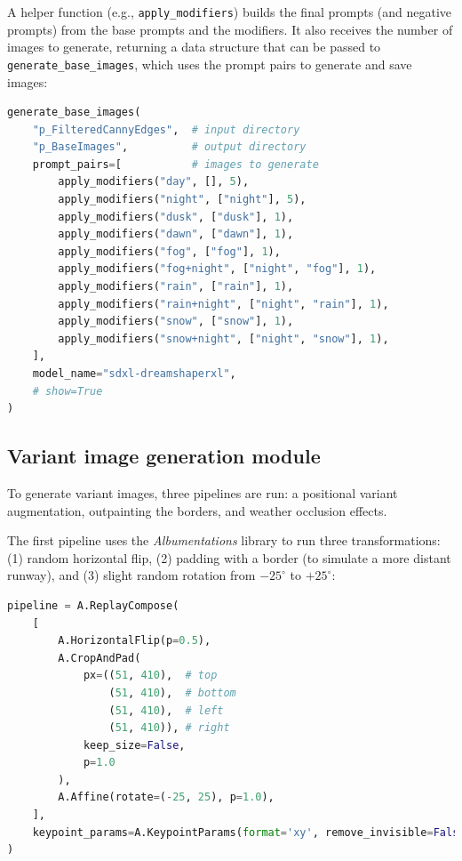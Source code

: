 A helper function (e.g., \texttt{apply\_modifiers}) builds the final prompts
(and negative prompts) from the base prompts and the modifiers. 
It also receives the number of images to generate, returning a data structure that can be passed to \texttt{generate\_base\_images}, which uses the prompt pairs to generate and save images:

\begin{lstlisting}[language=Python, caption={Base Image generation module,
generating base images}]
generate_base_images(
    "p_FilteredCannyEdges",  # input directory
    "p_BaseImages",          # output directory
    prompt_pairs=[           # images to generate
        apply_modifiers("day", [], 5),
        apply_modifiers("night", ["night"], 5),
        apply_modifiers("dusk", ["dusk"], 1),
        apply_modifiers("dawn", ["dawn"], 1),
        apply_modifiers("fog", ["fog"], 1),
        apply_modifiers("fog+night", ["night", "fog"], 1),
        apply_modifiers("rain", ["rain"], 1),
        apply_modifiers("rain+night", ["night", "rain"], 1),
        apply_modifiers("snow", ["snow"], 1),
        apply_modifiers("snow+night", ["night", "snow"], 1),
    ],
    model_name="sdxl-dreamshaperxl",
    # show=True
)
\end{lstlisting}

\subsection{Variant image generation module}

To generate variant images, three pipelines are run: a positional variant augmentation, outpainting the borders, and weather occlusion effects.

The first pipeline uses the \emph{Albumentations} library \cite{buslaev_albumentations_2020} to run three transformations: 
(1) random horizontal flip, 
(2) padding with a border (to simulate a more distant runway), and 
(3) slight random rotation from $-25^\circ$ to $+25^\circ$:

\begin{lstlisting}[language=Python, caption={Variant image generation module,
Albumentations pipeline}]
pipeline = A.ReplayCompose(
    [
        A.HorizontalFlip(p=0.5),
        A.CropAndPad(
            px=((51, 410),  # top
                (51, 410),  # bottom
                (51, 410),  # left
                (51, 410)), # right
            keep_size=False,
            p=1.0
        ),
        A.Affine(rotate=(-25, 25), p=1.0),
    ],
    keypoint_params=A.KeypointParams(format='xy', remove_invisible=False)
)
\end{lstlisting}

